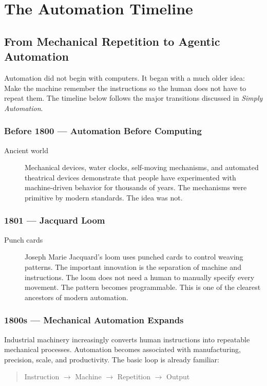 \documentclass[11pt,twoside]{book}
\begin{document}
\appendix

\chapter{The Automation Timeline}
\label{app:timeline}

\section*{From Mechanical Repetition to Agentic Automation}

Automation did not begin with computers.
It began with a much older idea:
Make the machine remember the instructions so the human does not have to repeat them.
The timeline below follows the major transitions discussed in \textit{Simply Automation}.

\subsection*{Before 1800 — Automation Before Computing}
\begin{description}
    \item[Ancient world] Mechanical devices, water clocks, self-moving mechanisms, and automated theatrical devices demonstrate that people have experimented with machine-driven behavior for thousands of years. The mechanisms were primitive by modern standards. The idea was not.
\end{description}

\subsection*{1801 — Jacquard Loom}
\begin{description}
    \item[Punch cards] Joseph Marie Jacquard's loom uses punched cards to control weaving patterns. The important innovation is the separation of machine and instructions. The loom does not need a human to manually specify every movement. The pattern becomes programmable. This is one of the clearest ancestors of modern automation.
\end{description}

\subsection*{1800s — Mechanical Automation Expands}
Industrial machinery increasingly converts human instructions into repeatable mechanical processes.
Automation becomes associated with manufacturing, precision, scale, and productivity.
The basic loop is already familiar:
\begin{quote}
\centering
Instruction $\rightarrow$ Machine $\rightarrow$ Repetition $\rightarrow$ Output
\end{quote}
\end{document}
